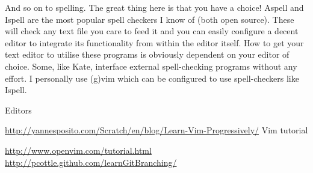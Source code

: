 And so on to spelling. The great thing here is that you have a choice! Aspell and Ispell are the most popular spell checkers I know of (both open source). These will check any text file you care to feed it and you can easily configure a decent editor to integrate its functionality from within the editor itself. How to get your text editor to utilise these programs is obviously dependent on your editor of choice. Some, like Kate, interface external spell-checking programs without any effort. I personally use (g)vim which can be configured to use spell-checkers like Ispell.

Editors

\url{http://yannesposito.com/Scratch/en/blog/Learn-Vim-Progressively/}
Vim tutorial

\url{http://www.openvim.com/tutorial.html}
\url{http://pcottle.github.com/learnGitBranching/}



